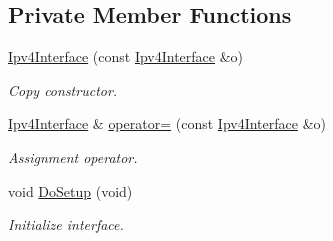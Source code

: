 \subsection*{Private Member Functions}
\begin{DoxyCompactItemize}
\item 
\hyperlink{classns3_1_1Ipv4Interface_a1ef29879f5638bdd94284b8786f67e15}{Ipv4\+Interface} (const \hyperlink{classns3_1_1Ipv4Interface}{Ipv4\+Interface} \&o)
\begin{DoxyCompactList}\small\item\em Copy constructor. \end{DoxyCompactList}\item 
\hyperlink{classns3_1_1Ipv4Interface}{Ipv4\+Interface} \& \hyperlink{classns3_1_1Ipv4Interface_ac7c0127d6761670f2476b4bc502795d0}{operator=} (const \hyperlink{classns3_1_1Ipv4Interface}{Ipv4\+Interface} \&o)
\begin{DoxyCompactList}\small\item\em Assignment operator. \end{DoxyCompactList}\item 
void \hyperlink{classns3_1_1Ipv4Interface_a2eec21493ab1ec3d00516f2dbe61e0d3}{Do\+Setup} (void)
\begin{DoxyCompactList}\small\item\em Initialize interface. \end{DoxyCompactList}\end{DoxyCompactItemize}
